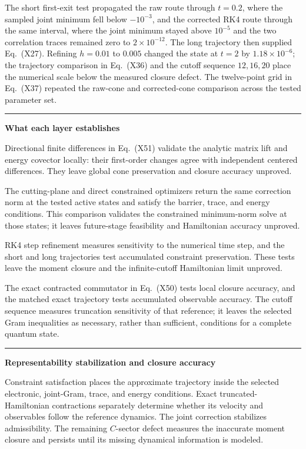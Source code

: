 \documentclass[10pt,letterpaper,twocolumn]{article}
\newcommand{\tracebox}[2]{%
  \par\smallskip
  \noindent\begin{minipage}{\columnwidth}
    {\color{#1}\rule{\columnwidth}{1.1pt}}\par\vspace{-1pt}
    \small\textbf{\color{#1}#2}\par\smallskip\color{black}
}
\newcommand{\closetracebox}{%
  \par\vspace{1pt}{\color{navy!35}\rule{\columnwidth}{0.35pt}}
  \end{minipage}\par\smallskip
}
\begin{document}
The short first-exit test propagated the raw route through
\(t=0.2\), where the sampled joint minimum fell below \(-10^{-3}\), and the
corrected RK4 route through the same interval, where the joint minimum stayed
above \(10^{-5}\) and the two correlation traces remained zero to
\(2\times10^{-12}\).  The long trajectory then supplied Eq.~(X27).
Refining \(h=0.01\) to \(0.005\) changed the state at \(t=2\) by
\(1.18\times10^{-6}\); the trajectory comparison in Eq.~(X36) and the
cutoff sequence \(12,16,20\) place the numerical scale below the measured
closure defect.  The twelve-point grid in Eq.~(X37) repeated the raw-cone and
corrected-cone comparison across the tested parameter set.

\tracebox{green}{What each layer establishes}
Directional finite differences in Eq.~(X51) validate the analytic matrix lift
and energy covector locally: their first-order changes agree with independent
centered differences.  They leave global cone preservation and closure
accuracy unproved.

The cutting-plane and direct constrained optimizers return the same correction
norm at the tested active states and satisfy the barrier, trace, and
energy conditions.  This comparison validates the constrained minimum-norm
solve at those states; it leaves future-stage feasibility and Hamiltonian
accuracy unproved.

RK4 step refinement measures sensitivity to the numerical time step, and the
short and long trajectories test accumulated constraint preservation.  These
tests leave the moment closure and the infinite-cutoff Hamiltonian limit
unproved.

The exact contracted commutator in Eq.~(X50) tests local closure accuracy, and
the matched exact trajectory tests accumulated observable accuracy.  The
cutoff sequence measures truncation sensitivity of that reference; it leaves
the selected Gram inequalities as necessary, rather than sufficient,
conditions for a complete quantum state.
\closetracebox

\tracebox{navy}{Representability stabilization and closure accuracy}
Constraint satisfaction places the approximate trajectory inside the selected
electronic, joint-Gram, trace, and energy conditions.  Exact
truncated-Hamiltonian contractions separately determine whether its velocity
and observables follow the reference dynamics.  The joint correction
stabilizes admissibility.  The remaining \(C\)-sector defect measures the
inaccurate moment closure and persists until its missing dynamical information
is modeled.
\closetracebox
\end{document}
